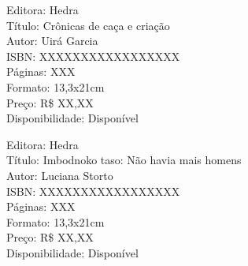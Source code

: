 \begin{ficha}
Editora: Hedra\\
Título: Crônicas de caça e criação\\
Autor:  Uirá Garcia\\ 
ISBN: XXXXXXXXXXXXXXXXX\\
Páginas: XXX\\
Formato: 13,3x21cm\\
Preço: R\$ XX,XX\\
Disponibilidade: Disponível
\end{ficha}

\pagebreak


\noindent{}\lipsum[1]

\begin{ficha}
Editora: Hedra\\
Título: Imbodnoko taso: Não havia mais homens\\
Autor:  Luciana Storto\\ 
ISBN: XXXXXXXXXXXXXXXXX\\
Páginas: XXX\\
Formato: 13,3x21cm\\
Preço: R\$ XX,XX\\
Disponibilidade: Disponível
\end{ficha}

\pagebreak
\pagestyle{hedracat}


